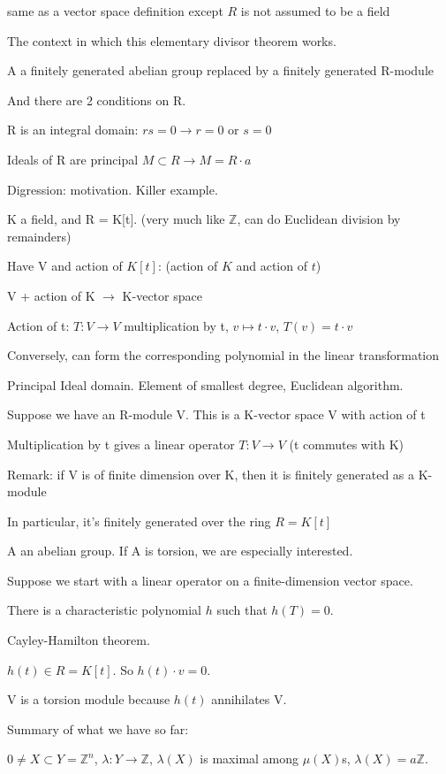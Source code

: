 \documentclass[12pt]{article}
\begin{document}
same as a vector space definition except $R$ is not assumed to be a field

\noindent
The context in which this elementary divisor theorem works.

A a finitely generated abelian group replaced by a finitely generated R-module

And there are 2 conditions on R.

R is an integral domain: $rs = 0 \to r = 0$ or $s = 0$

Ideals of R are principal $M \subset R \to M = R\cdot a$

\noindent
Digression: motivation.  Killer example.

K a field, and R = K[t]. (very much like $\mathds{Z}$, can do Euclidean division by remainders)

Have V and action of $K[t]$: (action of $K$ and action of $t$)

V + action of K $\to$ K-vector space

Action of t: $T: V \to V$ multiplication by t, $v \mapsto t \cdot v$, $T(v) = t \cdot v$

Conversely, can form the corresponding polynomial in the linear transformation

Principal Ideal domain.  Element of smallest degree, Euclidean algorithm.

Suppose we have an R-module V.  This is a K-vector space V with action of t

Multiplication by t gives a linear operator $T: V \to V$ (t commutes with K)

\noindent
Remark: if V is of finite dimension over K, then it is finitely generated as a K-module

In particular, it's finitely generated over the ring $R = K[t]$

\noindent
A an abelian group.  If A is torsion, we are especially interested.

\noindent
Suppose we start with a linear operator on a finite-dimension vector space.

There is a characteristic polynomial $h$ such that $h(T) = 0$.

Cayley-Hamilton theorem.

$h(t) \in R = K[t]$.  So $h(t) \cdot v = 0$.

V is a torsion module because $h(t)$ annihilates V.

\noindent
Summary of what we have so far:

$0 \neq X \subset Y = \mathds{Z}^n$, $\lambda: Y \to \mathds{Z}$, $\lambda(X)$ is maximal among $\mu(X)$s, $\lambda(X) = a\mathds{Z}$.
\end{document}
